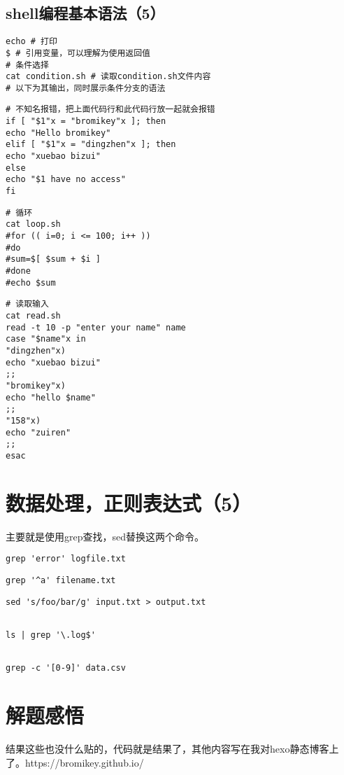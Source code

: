 \documentclass{article}
\begin{document}
		\subsection{shell编程基本语法（5）}
			\begin{lstlisting}
echo # 打印
$ # 引用变量，可以理解为使用返回值
# 条件选择
cat condition.sh # 读取condition.sh文件内容
# 以下为其输出，同时展示条件分支的语法
			\end{lstlisting}
			\begin{lstlisting}
# 不知名报错，把上面代码行和此代码行放一起就会报错
if [ "$1"x = "bromikey"x ]; then
echo "Hello bromikey"
elif [ "$1"x = "dingzhen"x ]; then
echo "xuebao bizui"
else
echo "$1 have no access"
fi
			\end{lstlisting}
			\begin{lstlisting}
# 循环
cat loop.sh
#for (( i=0; i <= 100; i++ ))
#do
#sum=$[ $sum + $i ]
#done
#echo $sum
			\end{lstlisting}
			\begin{lstlisting}			
# 读取输入
cat read.sh
read -t 10 -p "enter your name" name
case "$name"x in
"dingzhen"x)
echo "xuebao bizui"
;;
"bromikey"x)
echo "hello $name"
;;
"158"x)
echo "zuiren"
;;
esac
			\end{lstlisting}
	\section{数据处理，正则表达式（5）}
		主要就是使用grep查找，sed替换这两个命令。
			\begin{lstlisting}	
grep 'error' logfile.txt				
			\end{lstlisting}
					
			\begin{lstlisting}	
grep '^a' filename.txt				
			\end{lstlisting}
				
					
			\begin{lstlisting}	
sed 's/foo/bar/g' input.txt > output.txt
			
			\end{lstlisting}
				
					
			\begin{lstlisting}	
ls | grep '\.log$'
			
			\end{lstlisting}
			\begin{lstlisting}	
grep -c '[0-9]' data.csv
			\end{lstlisting}
	\section{解题感悟}
	结果这些也没什么贴的，代码就是结果了，其他内容写在我对hexo静态博客上了。https://bromikey.github.io/
	
\end{document}
